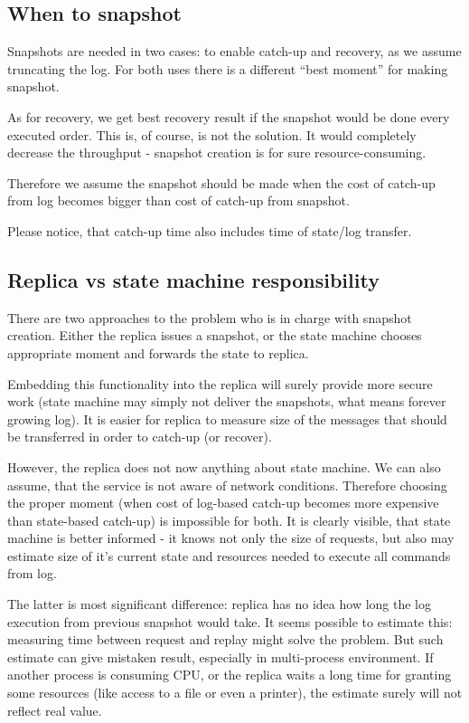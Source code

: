 \subsection{When to snapshot}
\label{subsec:when_to_snapshot}
Snapshots are needed in two cases: to enable catch-up and recovery, as we assume truncating the log. For both uses there is a different ``best moment'' for making snapshot.

As for recovery, we get best recovery result if the snapshot would be done every executed order.
This is, of course, is not the solution. It would completely decrease the throughput - snapshot creation is for sure resource-consuming.

Therefore we assume the snapshot should be made when the cost of catch-up from log becomes bigger than cost of catch-up from snapshot.

Please notice, that catch-up time also includes time of state/log transfer.

\subsection{Replica vs state machine responsibility}
\label{subsec:replica_vs_state_machine_responsibility}
There are two approaches to the problem who is in charge with snapshot creation. Either the replica issues a snapshot, or the state machine chooses appropriate moment and forwards the state to replica.

Embedding this functionality into the replica will surely provide more secure work (state machine may simply not deliver the snapshots, what means forever growing log). It is easier for replica to measure size of the messages that should be transferred in order to catch-up (or recover).

However, the replica does not now anything about state machine. We can also assume, that the service is not aware of network conditions. Therefore choosing the proper moment (when cost of log-based catch-up becomes more expensive than state-based catch-up) is impossible for both. It is clearly visible, that state machine is better informed - it knows not only the size of requests, but also may estimate size of it's current state and resources needed to execute all commands from log.

The latter is most significant difference: replica has no idea how long the log execution from previous snapshot would take. It seems possible to estimate this: measuring time between request and replay might solve the problem. But such estimate can give mistaken result, especially in multi-process environment. If another process is consuming CPU, or the replica waits a long time for granting some resources (like access to a file or even a printer), the estimate surely will not reflect real value.

